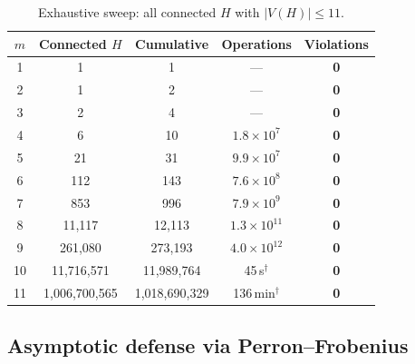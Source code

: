 \begin{table}[H]
\centering
\caption{Exhaustive sweep: all connected $H$ with $|V(H)| \le 11$.}
\label{tab:exhaustive}
\begin{tabular}{@{}ccccc@{}}
  \toprule
  $m$ & Connected $H$ & Cumulative & Operations & Violations \\
  \midrule
  1 & 1       & 1       & ---                     & \textbf{0} \\
  2 & 1       & 2       & ---                     & \textbf{0} \\
  3 & 2       & 4       & ---                     & \textbf{0} \\
  4 & 6       & 10      & $1.8 \times 10^7$   & \textbf{0} \\
  5 & 21      & 31      & $9.9 \times 10^7$   & \textbf{0} \\
  6 & 112     & 143     & $7.6 \times 10^8$   & \textbf{0} \\
  7 & 853     & 996     & $7.9 \times 10^9$   & \textbf{0} \\
  8 & 11,117  & 12,113  & $1.3 \times 10^{11}$ & \textbf{0} \\
  9 & 261,080 & 273,193 & $4.0 \times 10^{12}$ & \textbf{0} \\
  10 & 11,716,571 & 11,989,764 & 45\,s$^\dagger$ & \textbf{0} \\
  11 & 1,006,700,565 & 1,018,690,329 & 136\,min$^\dagger$ & \textbf{0} \\
  \bottomrule
\end{tabular}
\smallskip

\end{table}

\subsection{Asymptotic defense via Perron--Frobenius}

